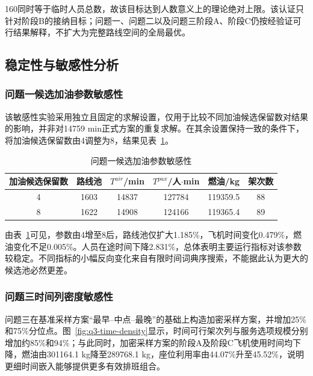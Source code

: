 160同时等于临时人员总数，故该目标达到人数意义上的理论绝对上限。该认证只针对阶段B的接纳目标；问题一、问题二以及问题三阶段A、阶段C仍按经验证可行结果解释，不扩大为完整路线空间的全局最优。

\subsection{稳定性与敏感性分析}\label{subsec:sensitivity}

\subsubsection{问题一候选加油参数敏感性}

该敏感性实验采用独立且固定的求解设置，仅用于比较不同加油候选保留数对结果的影响，并非对14759 min正式方案的重复求解。在其余设置保持一致的条件下，将加油候选保留数由4调整为8，结果见表~\ref{tab:q1-refuel-sensitivity}。

\begin{table}[htbp]
\centering
\caption{问题一候选加油参数敏感性}
\label{tab:q1-refuel-sensitivity}
\small
\setlength{\tabcolsep}{4pt}
\begin{tabular}{c c c c c c}
\toprule
加油候选保留数 & 路线池 & $T^{air}$/min & $T^{pax}$/人$\cdot$min & 燃油/kg & 架次数\\
\midrule
4 & 1603 & 14837 & 127784 & 119359.5 & 88\\
8 & 1622 & 14908 & 124166 & 119365.4 & 89\\
\bottomrule
\end{tabular}
\end{table}

由表~\ref{tab:q1-refuel-sensitivity}可见，参数由4增至8后，路线池仅扩大1.185\%，飞机时间变化0.479\%，燃油变化不足0.005\%。人员在途时间下降2.831\%，总体表明主要运行指标对该参数较稳定。不同指标的小幅反向变化来自有限时间词典序搜索，不能据此认为更大的候选池必然更差。

\subsubsection{问题三时间列密度敏感性}

问题三在基准采样方案“最早--中点--最晚”的基础上构造加密采样方案，并增加25\%和75\%分位点。图~\ref{fig:q3-time-density}显示，时间可行架次列与服务选项规模分别增加约85\%和94\%；与此同时，加密采样方案的阶段A及阶段C飞机使用时间均下降，燃油由301164.1 kg降至289768.1 kg，座位利用率由44.07\%升至45.52\%，说明更细时间嵌入能够提供更多有效排班组合。

